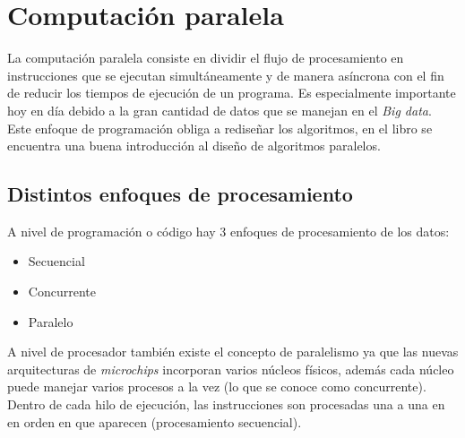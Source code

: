 
\chapter{Computación paralela}
La computación paralela consiste en dividir el flujo de procesamiento en instrucciones que se ejecutan 
simultáneamente y de manera asíncrona con el fin de reducir los tiempos de ejecución de un programa.
Es especialmente importante hoy en día debido a la gran cantidad de datos que se manejan en el \textit{Big data}.\\
Este enfoque de programación obliga a rediseñar los algoritmos, en el libro \cite{DBLP:books/cu/C2017}
se encuentra una buena introducción al diseño de algoritmos paralelos.



\section[Enfoques procesamiento]{Distintos enfoques de procesamiento}\label{sec:distintos_enfoques_procesamiento}
A nivel de programación o código hay 3 enfoques de procesamiento de los datos:

\begin{itemize}
  \item Secuencial
  \item Concurrente
  \item Paralelo
\end{itemize}

A nivel de procesador también existe el concepto de paralelismo ya que las nuevas arquitecturas de \textit{microchips}
incorporan varios núcleos físicos, además cada núcleo puede manejar varios procesos a la vez 
(lo que se conoce como concurrente). Dentro de cada hilo de ejecución, las instrucciones son procesadas una a una en 
en orden en que aparecen (procesamiento secuencial).
\newline


